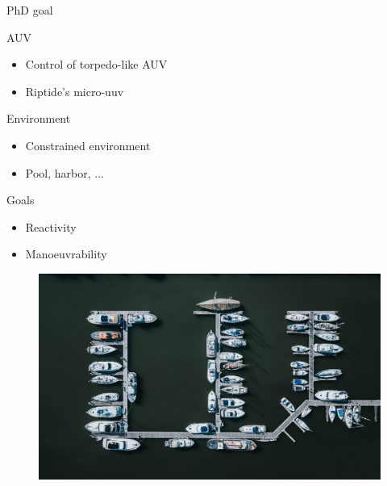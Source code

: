 \documentclass[10pt, xcolor={usenames, dvipsnames}]{beamer}
\begin{document}
            \begin{frame}{PhD goal}
                \begin{minipage}[c]{0.55\textwidth}
                    \begin{block}{AUV}
                        \vspace{0.25cm}
                        \begin{itemize}
                            \item Control of torpedo-like AUV \\ 
                            \item Riptide's micro-uuv
                        \end{itemize}
                    \end{block}
                    \begin{block}{Environment}
                        \begin{itemize}
                            \item Constrained environment \\ 
                            \item Pool, harbor, ...
                        \end{itemize}
                    \end{block}
                    \begin{block}{Goals}
                        \begin{itemize}
                            \item Reactivity \\
                            \item Manoeuvrability
                        \end{itemize}
                    \end{block}
                \end{minipage}
                \hfill
                \begin{minipage}[c]{0.4\textwidth}
                    \begin{figure}[htb]
                        \includegraphics[width=\textwidth]{imgs/harbour.png}


\end{figure}
\end{minipage}
\end{frame}
\end{document}
